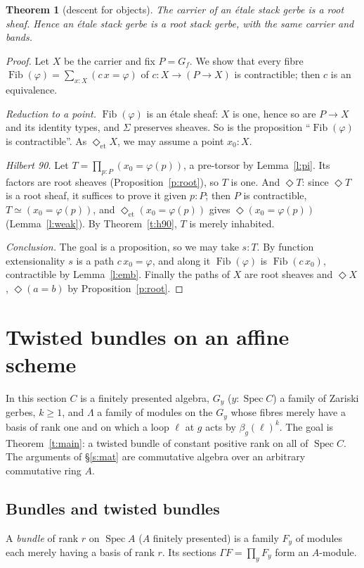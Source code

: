 \documentclass[11pt]{amsart}
\newtheorem{theorem}{Theorem}[section]
\theoremstyle{definition}
\theoremstyle{remark}
\newcommand{\Spec}{\operatorname{Spec}}
\newcommand{\Fib}{\operatorname{Fib}}
\newcommand{\close}{\Diamond}
\newcommand{\closeE}{\Diamond_{\mathrm{et}}}
\begin{document}
\begin{theorem}[descent for objects]\label{t:stack}
The carrier of an \'etale stack gerbe is a root sheaf. Hence an \'etale stack
gerbe is a root stack gerbe, with the same carrier and bands.
\end{theorem}
\begin{proof}
Let $X$ be the carrier and fix $P=G_f$. We show that every fibre
$\Fib(\varphi)=\sum_{x:X}(c\,x=\varphi)$ of $c:X\to(P\to X)$ is
contractible; then $c$ is an equivalence.

\emph{Reduction to a point.} $\Fib(\varphi)$ is an \'etale sheaf: $X$ is
one, hence so are $P\to X$ and its identity types, and $\Sigma$ preserves
sheaves. So is the proposition ``$\Fib(\varphi)$ is contractible''. As
$\closeE X$, we may assume a point $x_0:X$.

\emph{Hilbert 90.} Let $T=\prod_{p:P}(x_0=\varphi(p))$, a pre-torsor by
Lemma~\ref{l:pi}. Its factors are root sheaves (Proposition~\ref{p:root}),
so $T$ is one. And $\close T$: since $\close T$ is a root sheaf, it suffices
to prove it given $p:P$; then $P$ is contractible, $T\simeq(x_0=\varphi(p))$,
and $\closeE(x_0=\varphi(p))$ gives $\close(x_0=\varphi(p))$
(Lemma~\ref{l:weak}). By Theorem~\ref{t:h90}, $T$ is merely inhabited.

\emph{Conclusion.} The goal is a proposition, so we may take $s:T$. By
function extensionality $s$ is a path $c\,x_0=\varphi$, and along it
$\Fib(\varphi)$ is $\Fib(c\,x_0)$, contractible by Lemma~\ref{l:emb}.
Finally the paths of $X$ are root sheaves and $\close X$, $\close(a=b)$ by
Proposition~\ref{p:root}.
\end{proof}

\section{Twisted bundles on an affine scheme}\label{s:twisted}

In this section $C$ is a finitely presented algebra, $G_y$ ($y:\Spec C$) a
family of Zariski gerbes, $k\geq1$, and $\Lambda$ a family of modules on
the $G_y$ whose fibres merely have a basis of rank one and on which a loop
$\ell$ at $g$ acts by $\beta_g(\ell)^k$. The goal is
Theorem~\ref{t:main}: a twisted bundle of constant positive rank on all of
$\Spec C$. The arguments of \S\ref{s:mat} are commutative algebra over
an arbitrary commutative ring $A$.

\subsection{Bundles and twisted bundles}
A \emph{bundle} of rank $r$ on $\Spec A$ ($A$ finitely presented) is a
family $F_y$ of modules each merely having a basis of rank $r$. Its
sections $\Gamma F=\prod_yF_y$ form an $A$-module.
\end{document}
